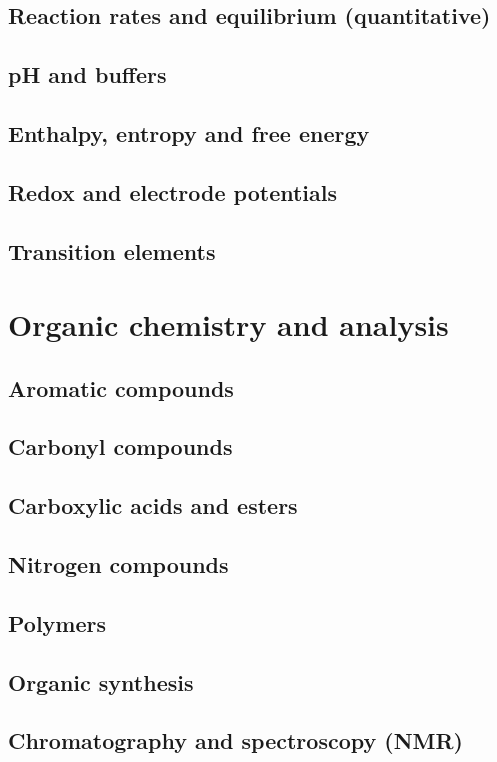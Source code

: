 \chapter{Reaction rates and equilibrium (quantitative)}
\chapter{pH and buffers}
\chapter{Enthalpy, entropy and free energy}
\chapter{Redox and electrode potentials}
\chapter{Transition elements}

\part{Organic chemistry and analysis}
\chapter{Aromatic compounds}
\chapter{Carbonyl compounds}
\chapter{Carboxylic acids and esters}
\chapter{Nitrogen compounds}
\chapter{Polymers}
\chapter{Organic synthesis}
\chapter{Chromatography and spectroscopy (NMR)}
